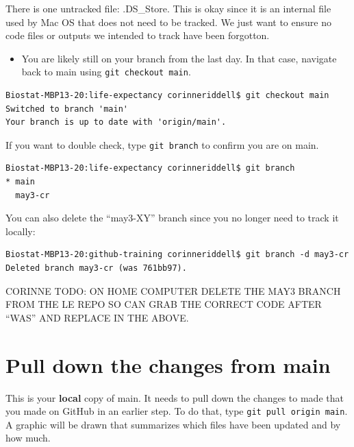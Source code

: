 \documentclass[
]{book}
\providecommand{\tightlist}{%
  \setlength{\itemsep}{0pt}\setlength{\parskip}{0pt}}
\begin{document}
There is one untracked file: .DS\_Store. This is okay since it is an internal
file used by Mac OS that does not need to be tracked. We just want to ensure
no code files or outputs we intended to track have been forgotton.

\begin{itemize}
\tightlist
\item
  You are likely still on your branch from the last day. In that case, navigate
  back to main using \texttt{git\ checkout\ main}.
\end{itemize}

\begin{verbatim}
Biostat-MBP13-20:life-expectancy corinneriddell$ git checkout main
Switched to branch 'main'
Your branch is up to date with 'origin/main'.
\end{verbatim}

If you want to double check, type \texttt{git\ branch} to confirm you are on
main.

\begin{verbatim}
Biostat-MBP13-20:life-expectancy corinneriddell$ git branch
* main
  may3-cr
\end{verbatim}

You can also delete the ``may3-XY'' branch since you no longer need to track it
locally:

\begin{verbatim}
Biostat-MBP13-20:github-training corinneriddell$ git branch -d may3-cr
Deleted branch may3-cr (was 761bb97).
\end{verbatim}

CORINNE TODO: ON HOME COMPUTER DELETE THE MAY3 BRANCH FROM THE LE REPO SO CAN
GRAB THE CORRECT CODE AFTER ``WAS'' AND REPLACE IN THE ABOVE.

\hypertarget{pull-down-the-changes-from-main}{%
\section{Pull down the changes from main}\label{pull-down-the-changes-from-main}}

This is your \textbf{local} copy of main. It needs to pull down the changes to
made that you made on GitHub in an earlier step. To do that, type \texttt{git\ pull\ origin\ main}.
A graphic will be drawn that summarizes which files have been updated and by
how much.
\end{document}
